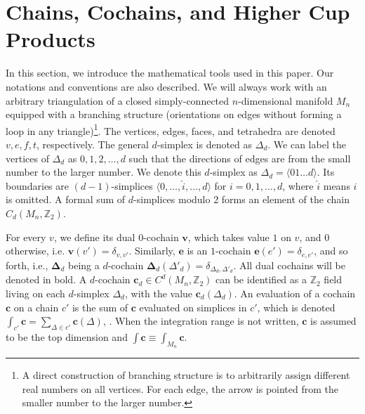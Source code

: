 \documentclass[12pt]{article}
\newcommand{\ZZ}{{\mathbb Z}}
\begin{document}
\section{Chains, Cochains, and Higher Cup \\ Products}



In this section, we introduce the mathematical tools used in this paper. Our notations and conventions are also described. We will always work with an arbitrary triangulation of a closed simply-connected $n$-dimensional manifold $M_n$ equipped with a branching structure (orientations on edges without forming a loop in any triangle)\footnote{ A direct construction of branching structure is to arbitrarily assign different real numbers on all vertices. For each edge, the arrow is pointed from the smaller number to the larger number.}. 
The vertices, edges, faces, and tetrahedra are denoted $v,e,f,t$, respectively. The general $d$-simplex is denoted as $\Delta_d$. We can label the vertices of $\Delta_d$ as $0,1,2,\dots,d$ such that the directions of edges are from the small number to the larger number. We denote this $d$-simplex as $\Delta_d = \langle 0 1 \dots d \rangle$. Its boundaries are $(d-1)$-simplices $\langle 0, \dots, \hat{i}, \dots, d \rangle$ for $i= 0, 1, \dots, d$, where $\hat{i}$ means $i$ is omitted. A formal sum of $d$-simplices modulo 2 forms an element of the chain $C_d(M_n,\ZZ_2)$. 



For every $v$, we define its dual $0$-cochain $\boldsymbol{v}$, which takes value $1$ on $v$, and $0$ otherwise, i.e. $\boldsymbol v(v') = \delta_{v,v'} $. Similarly, $\mathbf{e}$ is an $1$-cochain  $\boldsymbol e(e') = \delta_{e,e'} $, and so forth, i.e., $\boldsymbol \Delta_d$ being a $d$-cochain $\boldsymbol \Delta_d (\Delta'_d) = \delta_{\Delta_d,\Delta'_d}$.  All dual cochains will be denoted in bold. A $d$-cochain $\boldsymbol c_d \in C^d(M_n,\ZZ_2)$ can be identified as a $\ZZ_2$ field living on each $d$-simplex $\Delta_d$, with the value $\boldsymbol c_d (\Delta_d)$.
An evaluation of a cochain $\boldsymbol c$ on a chain $c'$ is the sum of $\boldsymbol c$ evaluated on simplices in $c'$, which is denoted $\int_{c'} \boldsymbol c = \sum_{\Delta \in c'} \boldsymbol c (\Delta)$, . When the integration range is not written, $\boldsymbol c$ is assumed to be the top dimension and $\int \boldsymbol c \equiv \int_{M_n} \boldsymbol c$.
\end{document}
